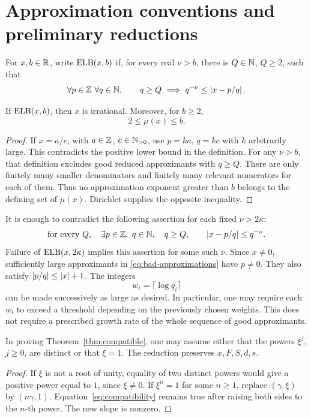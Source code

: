 \section{Approximation conventions and preliminary reductions}
\label{sec:preliminaries}

\begin{definition}
For \(x,b\in\mathbb R\), write \(\operatorname{ELB}(x,b)\) if, for every real \(\nu>b\),
there is \(Q\in\mathbb N\), \(Q\ge2\), such that
\[
 \forall p\in\mathbb Z\ \forall q\in\mathbb N,\qquad
 q\ge Q\ \Longrightarrow\ q^{-\nu}\le\left|x-p/q\right|.
\]
\end{definition}

\begin{lemma}\label{lem:endpoint}
If \(\operatorname{ELB}(x,b)\), then \(x\) is irrational. Moreover, for
\(b\ge2\),
\[
 2\le\mu(x)\le b.
\]
\end{lemma}
\begin{proof}
If \(x=a/c\), with \(a\in\mathbb Z\), \(c\in\mathbb N_{>0}\), use
\(p=ka\), \(q=kc\) with \(k\) arbitrarily large. This contradicts
the positive lower bound in the definition.
For any \(\nu>b\), that definition excludes good reduced approximants
with \(q\ge Q\). There are only finitely many smaller denominators
and finitely many relevant numerators for each of them. Thus no
approximation exponent greater than \(b\) belongs to the defining set
of \(\mu(x)\). Dirichlet supplies the opposite inequality.
\end{proof}

It is enough to contradict the following assertion for each fixed
\(\nu>2\kappa\):
\begin{equation}\label{eq:bad-approximations}
 \text{for every }Q,\quad
 \exists p\in\mathbb Z,\ q\in\mathbb N,\quad
 q\ge Q,\qquad\left|x-p/q\right|\le q^{-\nu}.
\end{equation}
Failure of \(\operatorname{ELB}(x,2\kappa)\) implies this assertion for some such
\(\nu\). Since \(x\ne0\), sufficiently large approximants in
\eqref{eq:bad-approximations} have \(p\ne0\).
They also satisfy \(\left|p/q\right|\le |x|+1\).
The integers
\[
 w_i=\lceil\log q_i\rceil
\]
can be made successively as large as desired. In particular, one may
require each \(w_i\) to exceed a threshold depending on the previously
chosen weights. This does not require a prescribed growth rate of the
whole sequence of good approximants.

\begin{lemma}\label{lem:torsion}
In proving Theorem~\ref{thm:compatible}, one may assume either that
the powers \(\xi^j\), \(j\ge0\), are distinct or that \(\xi=1\).
The reduction preserves \(x,F,S,d,s\).
\end{lemma}
\begin{proof}
If \(\xi\) is not a root of unity, equality of two distinct powers
would give a positive power equal to \(1\), since \(\xi\ne0\).
If \(\xi^n=1\) for some \(n\ge1\), replace \((\gamma,\xi)\)
by \((n\gamma,1)\). Equation~\eqref{eq:compatibility} remains true
after raising both sides to the \(n\)-th power.
The new slope is nonzero.
\end{proof}

